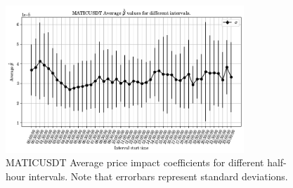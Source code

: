 \documentclass[a4paper, oneside, notitlepage]{book}
\begin{document}
\begin{figure}[htpb]
    \centering
    \includegraphics[width=0.8\textwidth]{./images/MATICUSDT_beta_across_time.png}
    \caption{MATICUSDT Average price impact coefficients for different half-hour intervals. Note that errorbars represent standard deviations.}
    \label{fig:MATICUSDT_beta_across_time}
\end{figure}
\end{document}
